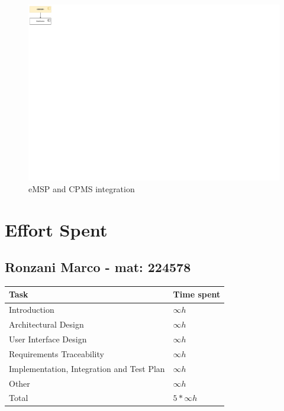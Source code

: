\documentclass[11pt]{article}
\begin{document}
\begin{figure}[!ht]
    \centering
    \includegraphics[page={11}, trim=0cm 11cm 13cm 0cmm, width=\linewidth, clip]{IntegrationDiagram.pdf}
    \caption{eMSP and CPMS integration}
\end{figure}

\newpage

\section{Effort Spent}

\subsection{Ronzani Marco - mat: 224578}

\begin{tabular}{|l|l|}
    \hline
    \textbf{Task} & \textbf{Time spent} \\
    \hline
    Introduction & $\infty h$ \\
    \hline
    Architectural Design & $\infty h$ \\
    \hline
    User Interface Design & $\infty h$ \\
    \hline
    Requirements Traceability & $\infty h$ \\
    \hline
    Implementation, Integration and Test Plan & $\infty h$ \\
    \hline
    Other & $\infty h$ \\
    \hline
    \hline
    Total & $5*\infty h$ \\
    \hline
\end{tabular}
\end{document}
